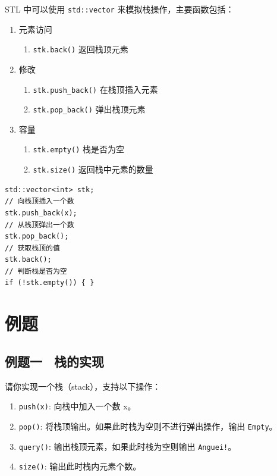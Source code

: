 \documentclass{report}
\begin{document}
STL 中可以使用 \texttt{std::vector} 来模拟栈操作，主要函数包括：

\begin{enumerate}
    \item 元素访问
    \begin{enumerate}
        \item \texttt{stk.back()} 返回栈顶元素
    \end{enumerate}
    \item 修改
    \begin{enumerate}
        \item \texttt{stk.push\_back()} 在栈顶插入元素
        \item \texttt{stk.pop\_back()} 弹出栈顶元素
    \end{enumerate}
    \item 容量
    \begin{enumerate}
        \item \texttt{stk.empty()} 栈是否为空
        \item \texttt{stk.size()} 返回栈中元素的数量
    \end{enumerate}
\end{enumerate}

\begin{verbatim}
std::vector<int> stk;
// 向栈顶插入一个数
stk.push_back(x);
// 从栈顶弹出一个数
stk.pop_back();
// 获取栈顶的值
stk.back();
// 判断栈是否为空
if (!stk.empty()) { }
\end{verbatim}

\section{例题}

\subsection{例题一 \ 栈的实现}

请你实现一个栈（stack），支持以下操作：

\begin{enumerate}
    \item \texttt{push(x)}: 向栈中加入一个数 x。
    \item \texttt{pop()}: 将栈顶输出。如果此时栈为空则不进行弹出操作，输出 \texttt{Empty}。
    \item \texttt{query()}: 输出栈顶元素，如果此时栈为空则输出 \texttt{Anguei!}。
    \item \texttt{size()}: 输出此时栈内元素个数。
\end{enumerate}
\end{document}
